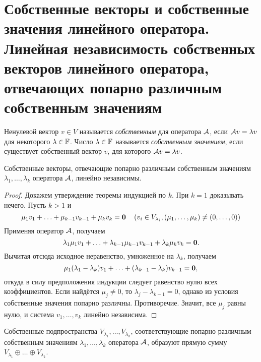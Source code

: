 \section{Собственные векторы и собственные значения линейного оператора. Линейная независимость собственных векторов линейного оператора, отвечающих попарно различным собственным значениям}

\begin{definition}
    Ненулевой вектор $v \in V$ называется \textit{собственным} для оператора $\mathcal{A}$, если $\mathcal{A} v = \lambda v$ для некоторого $\lambda \in \mathbb{F}$. Число $\lambda \in \mathbb{F}$ называется \textit{собственным значением}, если существует собственный вектор $v$, для которого $\mathcal{A} v = \lambda v$.
\end{definition}

\begin{proposal}
    Собственные векторы, отвечающие попарно различным собственным значениям $\lambda_1, \ldots, \lambda_k$ оператора $\mathcal{A}$, линейно независимы.
\end{proposal}

\begin{proof}
    Докажем утверждение теоремы индукцией по $k$. При $k = 1$ доказывать нечего. Пусть $k > 1$ и
    \[
        \mu_1v_1 + \ldots + \mu_{k - 1}v_{k - 1} + \mu_kv_k = \boldsymbol{0}\quad\left(v_i \in V_{\lambda_i}, (\mu_1, \ldots, \mu_k) \ne (0, \ldots, 0)\right)
    \]
    Применяя оператор $\mathcal{A}$, получаем
    \[
        \lambda_1\mu_1v_1 + \ldots + \lambda_{k - 1}\mu_{k - 1}v_{k - 1} + \lambda_k\mu_kv_k = \boldsymbol{0}.
    \]
    Вычитая отсюда исходное неравенство, умноженное на $\lambda_k$, получаем
    \[
        \mu_1(\lambda_1 - \lambda_k)v_1 + \ldots + (\lambda_{k - 1} - \lambda_k)v_{k - 1} = \boldsymbol{0},
    \]
    откуда в силу предположения индукции следует равенство нулю всех коэффициентов. Если найдётся $\mu_j \ne 0$, то $\lambda_j - \lambda_{k - 1} = 0$, однако из условия собственные значения попарно различны. Противоречие. Значит, все $\mu_j$ равны нулю, и система $v_1, \ldots, v_k$ линейно независима.
\end{proof}

\begin{corollary}
    Собственные подпространства $V_{\lambda_1}, \ldots, V_{\lambda_k}$, соответствующие попарно различным собственным значениям $\lambda_1, \ldots, \lambda_k$ оператора $\mathcal{A}$, образуют прямую сумму $V_{\lambda_1} \oplus \ldots \oplus V_{\lambda_k}$.
\end{corollary}

